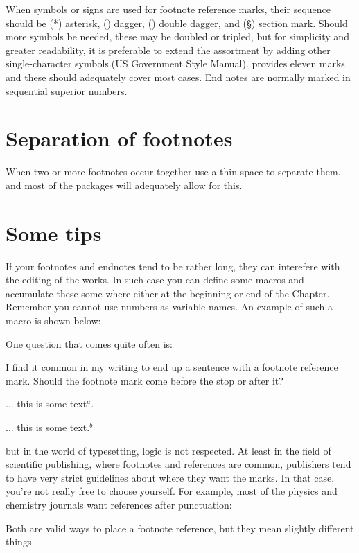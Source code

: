 When symbols or signs are used for footnote reference marks, their 
sequence should be (*) asterisk, (\dag) dagger, (\ddag) double dagger, and 
(\S) section mark. Should more symbols be needed, these may be 
doubled or tripled, but for simplicity and greater readability, it is 
preferable to extend the assortment by adding other single-character symbols.(US Government Style Manual). \latex provides eleven marks and these should adequately cover most cases. End notes are normally marked in sequential superior numbers.

\section*{Separation of footnotes}
When two or more footnotes occur together use a thin space to separate them.
\tex and most of the packages will adequately allow for this.


\section{Some tips}

If your footnotes and endnotes tend to be rather long, they can interefere with the editing of the works. In such case you can define some macros and accumulate these some where either at the beginning or end of the Chapter. Remember you cannot use numbers as variable names. An example of such a macro is shown below:

One question that comes quite often is:

I find it common in my writing to end up a sentence with a footnote reference mark. Should the footnote mark come before the stop or after it?

... this is some text$^a$.

... this is some text.$^b$


but in the world of typesetting, logic is not respected. At least in the field of scientific publishing, where footnotes and references are common, publishers tend to have very strict guidelines about where they want the marks. In that case, you're not really free to choose yourself. For example, most of the physics and chemistry journals want references after punctuation:

Both are valid ways to place a footnote reference, but they mean slightly different things.

